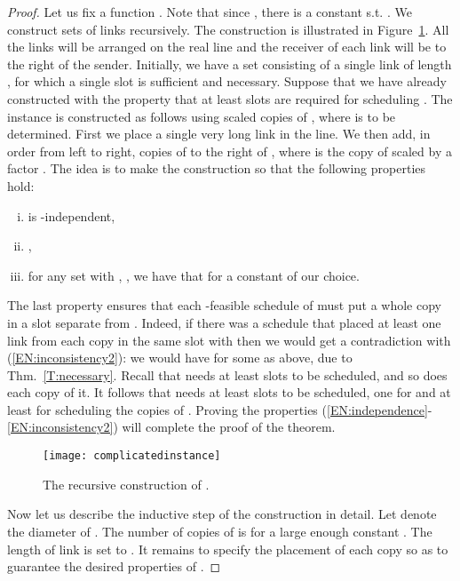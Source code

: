 \documentclass[11pt]{article}
\begin{document}
\begin{proof}
  Let us fix a function . Note that since , there is a constant  s.t. .  We construct sets   of links recursively. The construction is illustrated in Figure~\ref{fig:complicated}. All the links will be arranged on the real line and the receiver of
  each link will be to the right of the sender.  Initially, we have a set  consisting of a single
  link of length , for which a single slot is sufficient and necessary.  Suppose that we have already
  constructed  with the property that at least  slots are required for scheduling . The
  instance  is constructed as follows using  scaled copies of , where  is to be
  determined. First we place a single very long link  in the line. We then add, in order from left to
  right, copies 
   of  to the right of , where  is the copy of  scaled by a factor
  . The idea is to make the construction so that the following properties hold: 
  \begin{enumerate}[(i)]
  \setlength{\itemsep}{0cm}\setlength{\parskip}{0cm}\item   { is -independent,}\label{EN:independence}
  \item {,} \label{EN:lowerbound}
  \item {for any set 
  with , , we have that for a constant  of our choice.}\label{EN:inconsistency2}
 \end{enumerate}
  The last property ensures that each -feasible schedule of  must put a whole copy  in a slot separate from . Indeed, if there was a schedule that placed at least one link from each copy  in the same slot with  then we would get a contradiction with (\ref{EN:inconsistency2}): we would have  for some  as above, due to Thm.\ \ref{T:necessary}. Recall that  needs at least  slots to be scheduled, and so does each copy of it. It follows that  needs at least  slots to be scheduled, one for  and at least  for scheduling the copies of . Proving the properties (\ref{EN:independence}-\ref{EN:inconsistency2})  will complete the proof of the theorem.
\begin{figure}[htbp]
\begin{center}
\texttt{[image: complicatedinstance]}
\caption{The recursive construction of .}
\label{fig:complicated}
\end{center}
\end{figure}

Now let us describe the inductive step of the construction in detail. Let  denote the diameter of . The number of copies of  is  for a large enough constant . The length of link  is set to . It remains to specify the placement of each copy  so as to guarantee the desired properties of .


\end{proof}
\end{document}
